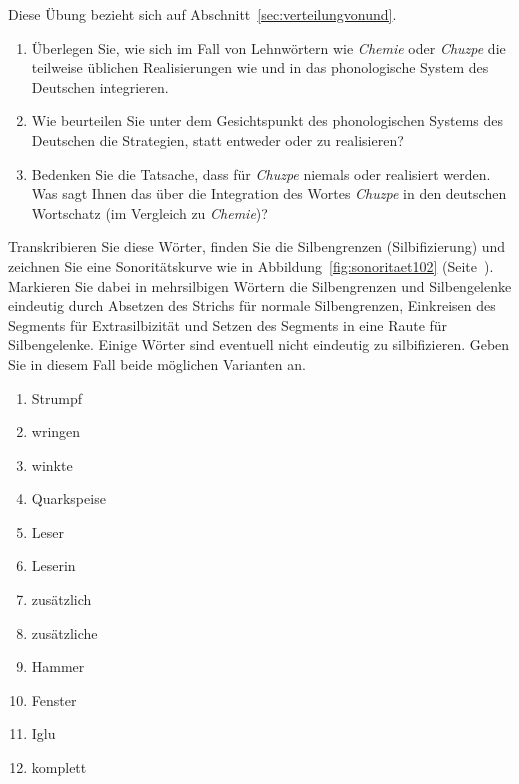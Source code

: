  \label{exc:phonologie03} Diese Übung bezieht sich auf Abschnitt~\ref{sec:verteilungvonund}.

\begin{enumerate}
  \item Überlegen Sie, wie sich im Fall von Lehnwörtern wie \textit{Chemie} oder \textit{Chuzpe} die teilweise üblichen Realisierungen wie \textipa{[\c{c}emi:]} und \textipa{[XU\t{ts}p@]} in das phonologische System des Deutschen integrieren.
  \item Wie beurteilen Sie unter dem Gesichtspunkt des phonologischen Systems des Deutschen die Strategien, statt \textipa{[\c{c}emi:]} entweder \textipa{[Semi:]} oder \textipa{[kemi:]} zu realisieren?
  \item Bedenken Sie die Tatsache, dass für \textit{Chuzpe} niemals \textipa{[SU\t{ts}p@]} oder \textipa{[kU\t{ts}p@]} realisiert werden.
    Was sagt Ihnen das über die Integration des Wortes \textit{Chuzpe} in den deutschen Wortschatz (im Vergleich zu \textit{Chemie})?
\end{enumerate}

 \label{exc:phonologie04} Transkribieren Sie diese Wörter, finden Sie die Silbengrenzen (Silbifizierung) und zeichnen Sie eine Sonoritätskurve wie in Abbildung~\ref{fig:sonoritaet102} (Seite~\pageref{fig:sonoritaet102}).
Markieren Sie dabei in mehrsilbigen Wörtern die Silbengrenzen und Silbengelenke eindeutig durch Absetzen des Strichs für normale Silbengrenzen, Einkreisen des Segments für Extrasilbizität und Setzen des Segments in eine Raute für Silbengelenke.
Einige Wörter sind eventuell nicht eindeutig zu silbifizieren.
Geben Sie in diesem Fall beide möglichen Varianten an.

\begin{enumerate}
  \item Strumpf
  \item wringen
  \item winkte
  \item Quarkspeise
  \item Leser
  \item Leserin
  \item zusätzlich
  \item zusätzliche
  \item Hammer
  \item Fenster
  \item Iglu
  \item komplett
\end{enumerate}

